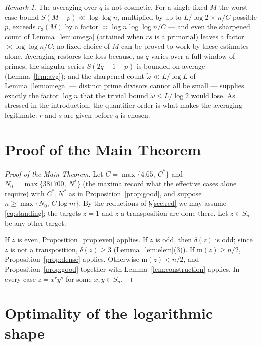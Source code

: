 \documentclass[11pt]{amsart}
\numberwithin{equation}{section}
\theoremstyle{remark}
\newtheorem{remark}[theorem]{Remark}
\newcommand{\md}{\mathrm{m}}   %
\begin{document}
\begin{remark}\label{rem:avg}
The averaging over $\tilde q$ is not cosmetic. For a single fixed $M$ the
worst-case bound $S(M-p)\ll\log\log n$, multiplied by up to $L/\log 2\asymp n/C$
possible $p$, exceeds $r_3(M)$ by a factor $\asymp\log n\log\log n/C$ --- and
even the sharpened count of Lemma~\ref{lem:omega} (attained when $rs$ is a
primorial) leaves a factor $\asymp\log\log n/C$: no fixed choice of $M$ can be
proved to work by these estimates alone. Averaging restores the loss
because, as $\tilde q$ varies over a full window of primes, the singular series
$S(2\tilde q-1-p)$ is bounded on average (Lemma~\ref{lem:avg}); and the sharpened
count $\tilde\omega\ll L/\log L$ of Lemma~\ref{lem:omega} --- distinct prime
divisors cannot all be small --- supplies exactly the factor $\log n$ that the
trivial bound $\tilde\omega\le L/\log 2$ would lose. As stressed in the
introduction, the quantifier order is what makes the averaging legitimate: $r$
and $s$ are given before $\tilde q$ is chosen.
\end{remark}

\section{Proof of the Main Theorem}\label{sec:proof}

\begin{proof}[Proof of the Main Theorem]
Let $C=\max\{4.65,\ C^*\}$ and $N_0=\max\{381700,\ N^*\}$ (the maxima record what
the effective cases alone require) with $C^*,N^*$ as in
Proposition~\ref{prop:good}, and suppose $n\ge\max\{N_0,\,C\log m\}$. By the
reductions of \S\ref{sec:red} we may assume \eqref{eq:standing}; the targets
$z=1$ and $z$ a transposition are done there. Let $z\in S_n$ be any other target.

If $z$ is even, Proposition~\ref{prop:even} applies. If $z$ is odd, then
$\delta(z)$ is odd; since $z$ is not a transposition, $\delta(z)\ge3$
(Lemma~\ref{lem:elem}(3)). If $\md(z)\ge n/2$, Proposition~\ref{prop:dense}
applies. Otherwise $\md(z)<n/2$, and Proposition~\ref{prop:good} together with
Lemma~\ref{lem:construction} applies. In every case $z=x^ry^s$ for some
$x,y\in S_n$.
\end{proof}

\section{Optimality of the logarithmic shape}\label{sec:lower}
\end{document}
